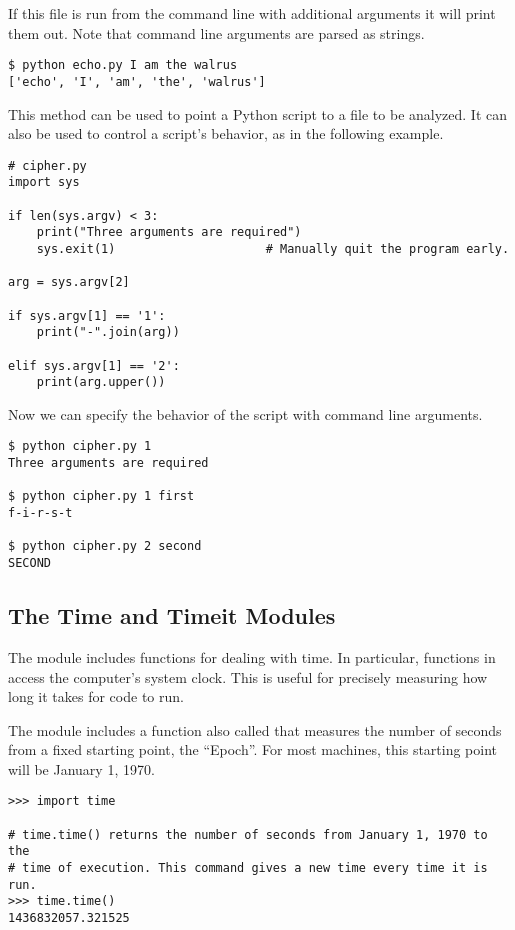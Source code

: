 If this file is run from the command line with additional arguments it will print them out.
Note that command line arguments are parsed as strings.

\begin{lstlisting}
$ python echo.py I am the walrus
['echo', 'I', 'am', 'the', 'walrus']
\end{lstlisting}

This method can be used to point a Python script to a file to be analyzed.
It can also be used to control a script's behavior, as in the following example.

\begin{lstlisting}
# cipher.py
import sys

if len(sys.argv) < 3:
    print("Three arguments are required")
    sys.exit(1)                     # Manually quit the program early.

arg = sys.argv[2]

if sys.argv[1] == '1':
    print("-".join(arg))

elif sys.argv[1] == '2':
    print(arg.upper())
\end{lstlisting}
Now we can specify the behavior of the script with command line arguments.

\begin{lstlisting}
$ python cipher.py 1
Three arguments are required

$ python cipher.py 1 first
f-i-r-s-t

$ python cipher.py 2 second
SECOND
\end{lstlisting}

\subsection*{The Time and Timeit Modules}

The  module includes functions for dealing with time.
In particular, functions in  access the computer's system clock.
This is useful for precisely measuring how long it takes for code to run.

The  module includes a function also called  that measures the number of seconds from a fixed starting point, the ``Epoch''.
For most machines, this starting point will be January 1, 1970.

\begin{lstlisting}
>>> import time

# time.time() returns the number of seconds from January 1, 1970 to the
# time of execution. This command gives a new time every time it is run.
>>> time.time()
1436832057.321525
\end{lstlisting}

